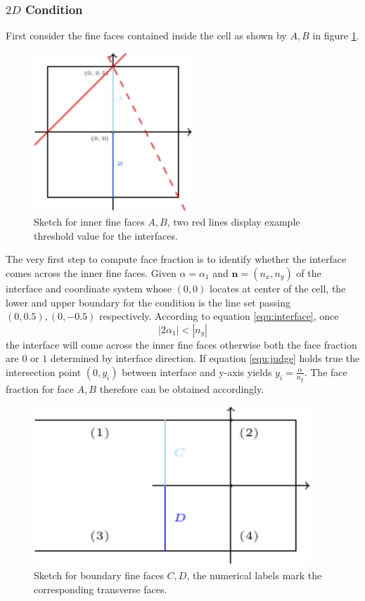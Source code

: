 \documentclass[a4paper]{article}
\begin{document}
\subsubsection{$2D$ Condition}
First consider the fine faces contained inside the cell as shown by $A,B$ in figure \ref{fig:2Dinner}.\par
\begin{figure}[h]
    \centering
    \includegraphics[height=6cm]{image/fs_2D.pdf}
    \caption{Sketch for inner fine faces $A,B$, two red lines display example threshold value for the interfaces.}
    \label{fig:2Dinner}
\end{figure}
The very first step to compute face fraction is to identify whether the interface comes across the inner fine faces. Given $\alpha=\alpha_1$ and $\mathbf{n}=(n_x,n_y)$ of the interface and coordinate system whose $(0,0)$ locates at center of the cell, the lower and upper boundary for the condition is the line set passing $(0,0.5),(0,-0.5)$ respectively. According to equation \ref{equ:interface}, once
\begin{equation}\label{equ:judge}
    |2\alpha_1|<|n_y|
\end{equation}
the interface will come across the inner fine faces otherwise both the face fraction are $0$ or $1$ determined by interface direction.
If equation \ref{equ:judge} holds true the intersection point $(0,y_i)$ between interface and y-axis yields $y_i = \frac{\alpha}{n_y}$. The face fraction for face $A,B$ therefore can be obtained accordingly.\par
\begin{figure}[h]
    \centering
    \includegraphics[height=6cm]{image/fs_2D2.pdf}
    \caption{Sketch for boundary fine faces $C,D$, the numerical labels mark the corresponding transverse faces.}
    \label{fig:2Dboundary}
\end{figure}
\end{document}
